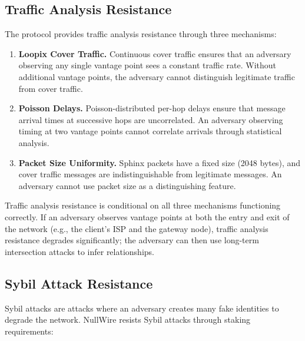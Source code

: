 \documentclass[11pt]{article}
\theoremstyle{definition}
\theoremstyle{remark}
\begin{document}
\subsection{Traffic Analysis Resistance}
\label{subsec:traffic-analysis}

The protocol provides traffic analysis resistance through three mechanisms:

\begin{enumerate}
    \item \textbf{Loopix Cover Traffic.} Continuous cover traffic ensures that an adversary observing any single vantage point sees a constant traffic rate. Without additional vantage points, the adversary cannot distinguish legitimate traffic from cover traffic.

    \item \textbf{Poisson Delays.} Poisson-distributed per-hop delays ensure that message arrival times at successive hops are uncorrelated. An adversary observing timing at two vantage points cannot correlate arrivals through statistical analysis.

    \item \textbf{Packet Size Uniformity.} Sphinx packets have a fixed size (2048 bytes), and cover traffic messages are indistinguishable from legitimate messages. An adversary cannot use packet size as a distinguishing feature.
\end{enumerate}

Traffic analysis resistance is conditional on all three mechanisms functioning correctly. If an adversary observes vantage points at both the entry and exit of the network (e.g., the client's ISP and the gateway node), traffic analysis resistance degrades significantly; the adversary can then use long-term intersection attacks to infer relationships.

\subsection{Sybil Attack Resistance}
\label{subsec:sybil}

Sybil attacks are attacks where an adversary creates many fake identities to degrade the network. NullWire resists Sybil attacks through staking requirements:
\end{document}
